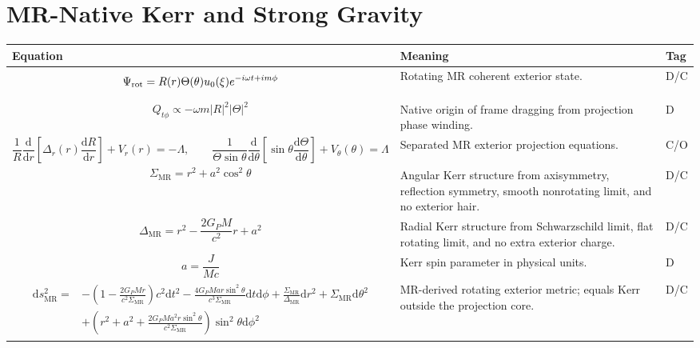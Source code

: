 \documentclass[11pt]{article}
\newcommand{\MR}{\mathrm{MR}}
\newcommand{\dd}{\mathrm{d}}
\begin{document}
\section{MR-Native Kerr and Strong Gravity}
\begin{longtable}{>{\raggedright\arraybackslash}p{} >{\raggedright\arraybackslash}p{} >{\centering\arraybackslash}p{}}
\toprule
\textbf{Equation} & \textbf{Meaning} & \textbf{Tag} \\
\midrule
\endhead

\begin{equation}
\Psi_{\rm rot}=R(r)\Theta(\theta)u_0(\xi)e^{-i\omega t+im\phi}
\end{equation}
& Rotating MR coherent exterior state. & D/C \\

\begin{equation}
Q_{t\phi}\propto -\omega m |R|^2|\Theta|^2
\end{equation}
& Native origin of frame dragging from projection phase winding. & D \\

\begin{equation}
\frac{1}{R}\frac{\dd}{\dd r}\left[\Delta_r(r)\frac{\dd R}{\dd r}\right]+V_r(r)=-\Lambda,
\qquad
\frac{1}{\Theta\sin\theta}\frac{\dd}{\dd\theta}\left[\sin\theta\frac{\dd\Theta}{\dd\theta}\right]+V_\theta(\theta)=\Lambda
\end{equation}
& Separated MR exterior projection equations. & C/O \\

\begin{equation}
\Sigma_{\MR}=r^2+a^2\cos^2\theta
\end{equation}
& Angular Kerr structure from axisymmetry, reflection symmetry, smooth nonrotating limit, and no exterior hair. & D/C \\

\begin{equation}
\Delta_{\MR}=r^2-\frac{2G_PM}{c^2}r+a^2
\end{equation}
& Radial Kerr structure from Schwarzschild limit, flat rotating limit, and no extra exterior charge. & D/C \\

\begin{equation}
a=\frac{J}{Mc}
\end{equation}
& Kerr spin parameter in physical units. & D \\

\begin{equation}
\begin{aligned}
\dd s^2_{\MR}={}&-
\left(1-\frac{2G_PMr}{c^2\Sigma_{\MR}}\right)c^2\dd t^2
-
\frac{4G_PMar\sin^2\theta}{c^3\Sigma_{\MR}}\dd t\dd\phi
+
\frac{\Sigma_{\MR}}{\Delta_{\MR}}\dd r^2
+
\Sigma_{\MR}\dd\theta^2\\
&+\left(r^2+a^2+\frac{2G_PMa^2r\sin^2\theta}{c^2\Sigma_{\MR}}\right)\sin^2\theta\dd\phi^2
\end{aligned}
\end{equation}
& MR-derived rotating exterior metric; equals Kerr outside the projection core. & D/C \\


\end{longtable}
\end{document}
